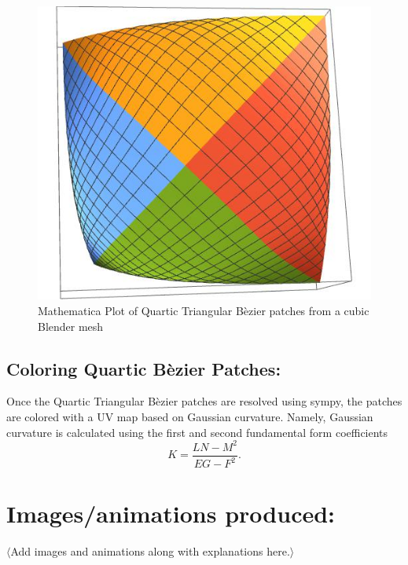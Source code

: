 \documentclass[11pt]{article}
\begin{document}
	\begin{figure}[!bp]
		\centering
		\captionsetup{justification=centering}
		\includegraphics[width=.43\linewidth]{img/bezier_patch}
		\caption{Mathematica Plot of Quartic Triangular B\`ezier patches from  a cubic Blender mesh}
	\end{figure}
	
	\quad
	\pagebreak
	
	\subsection*{Coloring Quartic B\`ezier Patches:}
	Once the Quartic Triangular B\`ezier patches are resolved using sympy, the patches are colored with a UV map based on Gaussian curvature. Namely, Gaussian curvature is calculated using the first and second fundamental form coefficients $$K = \dfrac{LN-M^2}{EG-F^2}.$$
	
	
	\section*{Images/animations produced:}
	$\langle$Add images and animations along with explanations here.$\rangle$
	
	
	
\end{document}
